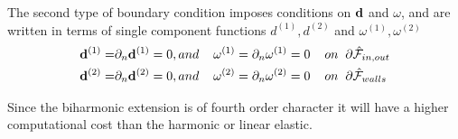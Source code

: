 The second type of boundary condition imposes conditions on $\bold{d}$ and $\omega$, and are written in terms of single component functions $d^{(1)},d^{(2)}$ and $\omega^{(1)}, \omega^{(2)}$	
\begin{align}
\bold{d}^{(1)} =& \partial_n \bold{d}^{(1)} = 0 , and \hspace{4mm}   \omega^{(1)} = \partial_n \omega^{(1)} = 0    \hspace{4mm} on \hspace{2mm} \partial \hat{\mathcal{F}}_{in,out} \\
\bold{d}^{(2)} =& \partial_n \bold{d}^{(2)} = 0 , and \hspace{4mm}   \omega^{(2)} = \partial_n \omega^{(2)} = 0    \hspace{4mm} on \hspace{2mm} \partial \hat{\mathcal{F}}_{walls} \\
\end{align}

Since the biharmonic extension is of fourth order character it will have a higher computational cost \cite{Richter2016} than the harmonic or linear elastic. 

